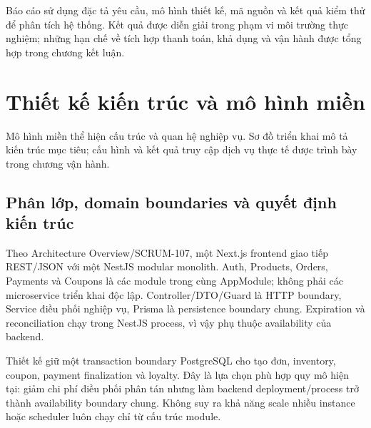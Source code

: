 \documentclass[12pt,a4paper]{article}
\begin{document}
Báo cáo sử dụng đặc tả yêu cầu, mô hình thiết kế, mã nguồn và kết quả kiểm thử để phân tích hệ thống. Kết quả được diễn giải trong phạm vi môi trường thực nghiệm; những hạn chế về tích hợp thanh toán, khả dụng và vận hành được tổng hợp trong chương kết luận.
\clearpage
\begingroup\small
\tableofcontents
\endgroup
\clearpage
\listoffigures
\clearpage
\listoftables
\clearpage

\clearpage

\clearpage

\clearpage

\clearpage

\clearpage
\section{Thiết kế kiến trúc và mô hình miền}
Mô hình miền thể hiện cấu trúc và quan hệ nghiệp vụ. Sơ đồ triển khai mô tả kiến trúc mục tiêu; cấu hình và kết quả truy cập dịch vụ thực tế được trình bày trong chương vận hành.
\subsection{Phân lớp, domain boundaries và quyết định kiến trúc}
Theo Architecture Overview/SCRUM-107, một Next.js frontend giao tiếp REST/JSON
với một NestJS modular monolith. Auth, Products, Orders, Payments và Coupons
là các module trong cùng AppModule; không phải các microservice triển khai
độc lập. Controller/DTO/Guard là HTTP boundary, Service điều phối nghiệp vụ,
Prisma là persistence boundary chung. Expiration và reconciliation chạy trong
NestJS process, vì vậy phụ thuộc availability của backend.

Thiết kế giữ một transaction boundary PostgreSQL cho tạo đơn, inventory,
coupon, payment finalization và loyalty. Đây là lựa chọn phù hợp quy mô hiện
tại: giảm chi phí điều phối phân tán nhưng làm backend deployment/process trở
thành availability boundary chung. Không suy ra khả năng scale nhiều instance
hoặc scheduler luôn chạy chỉ từ cấu trúc module.
\end{document}
